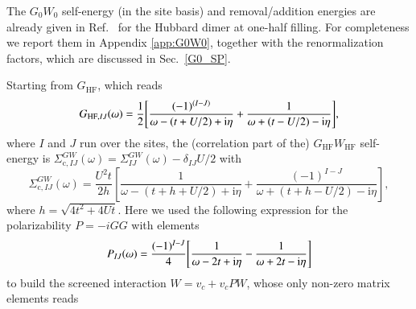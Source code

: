 \documentclass[aps,prb,reprint,superscriptaddress]{revtex4-1}
\newcommand{\STEcommc}[1]{{\color{blue} #1}}
\newcommand{\STEcomm}[1]{\STEcommc{(\underline{\bf SDS}: #1)}}
\newcommand{\I}{\text{i}}
\newcommand{\bn}{\text{bn}}
\newcommand{\an}{\text{an}}
\begin{document}
The $G_0W_0$ self-energy (in the site basis) and removal/addition energies are already given in Ref.~\citep{Romaniello_2012} for the Hubbard dimer at one-half filling. For completeness we report them in Appendix \ref{app:G0W0}, together with the renormalization factors, which are discussed in Sec.~\ref{G0_SP}.

Starting from $G_\text{HF}$, which reads
\begin{equation}
\label{Eqn:G_site}
    G_{\text{HF},IJ}(\omega) = \frac{1}{2}
    \qty[ \frac{(-1)^{(I-J)}}{\omega-(t+U/2)+\I\eta}
    +\frac{1}{\omega+(t-U/2)-\I\eta} ],
\end{equation}
where $I$ and $J$ run over the sites, the (correlation part of the) $G_\text{HF}W_\text{HF}$ self-energy is $\Sigma^{GW}_{\text{c},IJ}(\omega) = \Sigma^{GW}_{IJ}(\omega)-\delta_{IJ} U/2$ with
\begin{equation}
\label{Eqn:Sig_site}
    \Sigma^{GW}_{\text{c},IJ}(\omega) =\frac{U^2t}{2h}
    \left[ \frac{1}{\omega-(t+h+U/2)+\I\eta}  +\frac{(-1)^{I-J}}{\omega+(t+h-U/2)-\I\eta}\right],
\end{equation}
where $h=\sqrt{4t^2+4Ut}$. Here we used the following expression for the polarizability $P=-iGG$ with elements
\begin{equation}
\label{Eqn:P_site}
    P_{IJ}(\omega)=\frac{(-1)^{I-J}}{4}
    \qty[\frac{1}{\omega-2t+\I\eta}-\frac{1}{\omega+2t-\I\eta}]
\end{equation}
to build the screened interaction $W=v_c +v_cPW$, whose only non-zero matrix elements reads 
\end{document}
